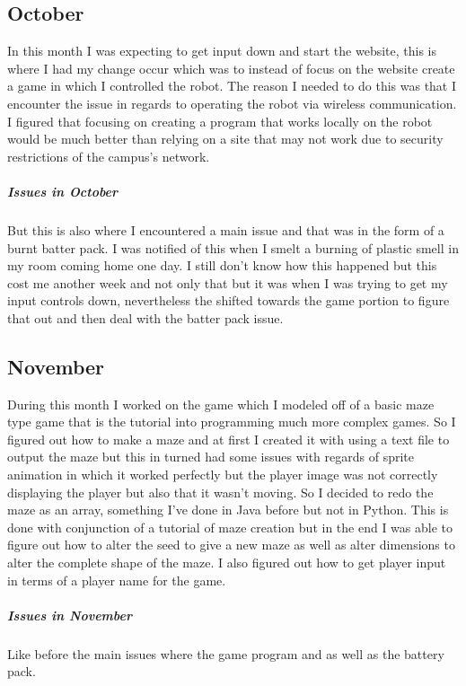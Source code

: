 \documentclass[13ptletterpaper]{paper}
\newcommand\tab[1][1cm]{\hspace*{#1}}
\begin{document}
\begin{flushleft}
	\subsection{October} 
	\tab In this month I was expecting to get input down and start the website, this is where I had my change occur which was to instead of focus on the website create a game in which I controlled the robot. The reason I needed to do this was that I encounter the issue in regards to operating the robot via wireless communication. I figured that focusing on creating a program that works locally on the robot would be much better than relying on a site that may not work due to security restrictions of the campus's network. 
	\subparagraph{Issues in October} But this is also where I encountered a main issue and that was in the form of a burnt batter pack. I was notified of this when I smelt a burning of plastic smell in my room coming home one day. I still don't know how this happened but this cost me another week and not only that but it was when I was trying to get my input controls down, nevertheless the shifted towards the game portion to figure that out and then deal with the batter pack issue.
	\subsection{November} 
	\tab During this month I worked on the game which I modeled off of a basic maze type game that is the tutorial into programming much more complex games. So I figured out how to make a maze and at first I created it with using a text file to output the maze but this in turned had some issues with regards of sprite animation in which it worked perfectly but the player image was not correctly displaying the player but also that it wasn't moving. So I decided to redo the maze as an array, something I've done in Java before but not in Python. This is done with conjunction of a tutorial of maze creation but in the end I was able to figure out how to alter the seed to give a new maze as well as alter dimensions to alter the complete shape of the maze. I also figured out how to get player input in terms of a player name for the game.
	\subparagraph{Issues in November}Like before the main issues where the game program and as well as the battery pack. 

\end{flushleft}
\end{document}
